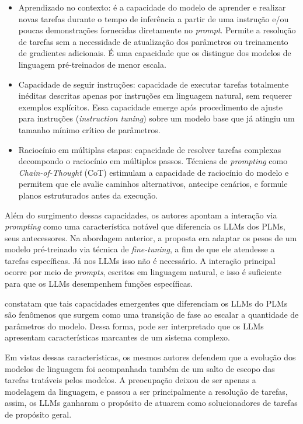 \documentclass[12pt,oneside,a4paper,brazil,sumario=tradicional]{abntex2}
\begin{document}
\begin{itemize}
  \item Aprendizado no contexto: é a capacidade do modelo de aprender e realizar novas tarefas durante o tempo de inferência a partir de uma instrução e/ou poucas demonstrações fornecidas diretamente no \textit{prompt}. Permite a resolução de tarefas sem a necessidade de atualização dos parâmetros ou treinamento de gradientes adicionais. É uma capacidade que os distingue dos modelos de linguagem pré-treinados de menor escala.
  \item Capacidade de seguir instruções: capacidade de executar tarefas totalmente inéditas descritas apenas por instruções em linguagem natural, sem requerer exemplos explícitos. Essa capacidade emerge após procedimento de ajuste para instruções  (\textit{instruction tuning}) sobre um modelo base que já atingiu um tamanho mínimo crítico de parâmetros.
  \item Raciocínio em múltiplas etapas: capacidade de resolver tarefas complexas decompondo o raciocínio em múltiplos passos. Técnicas de \textit{prompting} como \textit{Chain-of-Thought} (CoT) estimulam a capacidade de raciocínio do modelo e permitem que ele avalie caminhos alternativos, antecipe cenários, e formule planos estruturados antes da execução.
\end{itemize}
Além do surgimento dessas capacidades, os autores apontam a interação via \textit{prompting} como uma característica notável que diferencia os LLMs dos PLMs, seus antecessores. Na abordagem anterior, a proposta era adaptar os pesos de um modelo pré-treinado via técnica de \textit{fine-tuning}, a fim de que ele atendesse a tarefas específicas. Já nos LLMs isso não é necessário. A interação principal ocorre por meio de \textit{prompts}, escritos em linguagem natural, e isso é suficiente para que os LLMs desempenhem funções específicas.

 constatam que tais capacidades emergentes que diferenciam os LLMs do PLMs são fenômenos que surgem como uma transição de fase ao escalar a quantidade de parâmetros do modelo. Dessa forma, pode ser interpretado que os LLMs apresentam características marcantes de um sistema complexo.

Em vistas dessas características, os mesmos autores defendem que a evolução dos modelos de linguagem foi acompanhada também de um salto de escopo das tarefas tratáveis pelos modelos. A preocupação deixou de ser apenas a modelagem da linguagem, e passou a ser principalmente a resolução de tarefas, assim, os LLMs ganharam o propósito de atuarem como solucionadores de tarefas de propósito geral.
\end{document}
